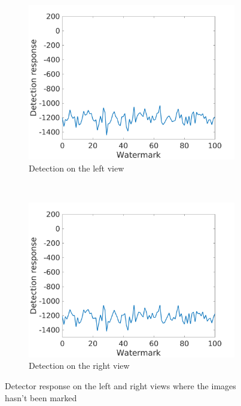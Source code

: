 \begin{figure}[h!]
    \centering
    \begin{subfigure}[t]{0.5\textwidth}
        \centering
\includegraphics[width=1\textwidth]{./img/likelihood/correct_LikelihoodL_NM.png}
          \caption{\small{Detection on the left view}}
\label{fig:Llnm}

    \end{subfigure}%
    ~ 
    \begin{subfigure}[t]{0.5\textwidth}
        \centering
\includegraphics[width=1\textwidth]{./img/likelihood/correct_LikelihoodLr_NM.png}
           \caption{\small{Detection on the right view}}
\label{fig:Lrnm}
    \end{subfigure}
    \caption{Detector response on the left and right views where the images hasn't been marked}
    \label{fig:Lnm}
\end{figure}


